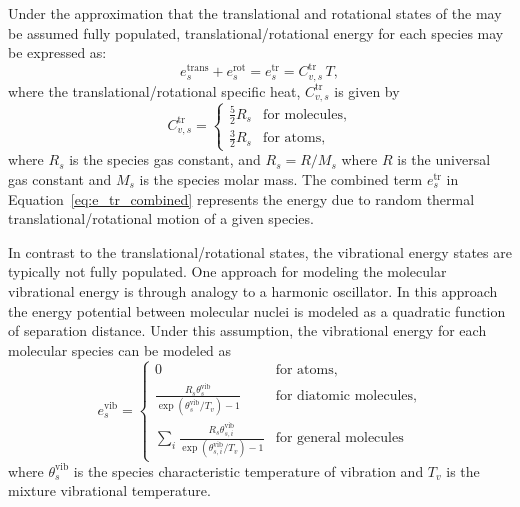 \documentclass[10pt]{article}
\newcommand{\vib}{\text{vib}}
\begin{document}
Under the approximation that the translational and rotational states of the may be assumed fully populated, translational/rotational energy for each species may be expressed as:
\begin{equation}
 \label{eq:e_tr_combined}
 e^{\text{trans}}_s + e^{\text{rot}}_s = e^{\text{tr}}_s = C^{\text{tr}}_{v,s}\, T ,
\end{equation}
where the translational/rotational specific heat, $C^{\text{tr}}_{v,s}$ is given by
\begin{equation*}
 C^{\text{tr}}_{v,s} =
 \begin{cases}
 \frac{5}{2} R_s & \text{for molecules}, \\
 \frac{3}{2} R_s & \text{for atoms},
 \end{cases}
\end{equation*}
where $R_s$ is the species gas constant, and $R_s = R/M_s$ where $R$ is the universal gas constant and $M_s$ is the species molar mass. The combined term $e^{\text{tr}}_s$ in Equation~\eqref{eq:e_tr_combined} represents the energy due to random thermal translational/rotational motion of a given species.

In contrast to the translational/rotational states, the vibrational energy states are typically not fully populated. One approach for modeling the molecular vibrational energy is through analogy to a harmonic oscillator.  In this approach the energy potential between molecular nuclei is modeled as a quadratic function of separation distance.  Under this assumption, the vibrational energy for each molecular species can be modeled as
\begin{equation}
  \label{eq:species_vibrational_energy}
  e^{\text{vib}}_s = 
  \begin{cases}    
    0 & \text{for atoms}, \\
    \frac{R_s\theta^{\vib}_{s}}{\exp\left(\theta^{\vib}_{s}/T_v\right) - 1} & \text{for diatomic molecules}, \\
    \sum_i \frac{R_s\theta^{\vib}_{s,i}}{\exp\left(\theta^{\vib}_{s,i}/T_v\right) - 1} & \text{for general molecules}
  \end{cases}
\end{equation}
where $\theta^{\vib}_{s}$ is the species characteristic temperature of vibration and $T_v$ is the mixture vibrational temperature.

\end{document}

